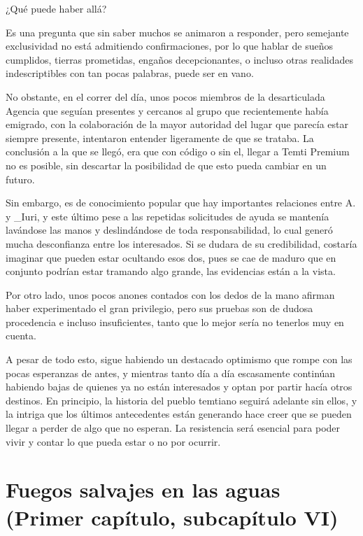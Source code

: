 \documentclass[
  spanish,
]{book}
\begin{document}
¿Qué puede haber allá?

Es una pregunta que sin saber muchos se animaron a responder, pero semejante exclusividad no está admitiendo confirmaciones, por lo que hablar de sueños cumplidos, tierras prometidas, engaños decepcionantes, o incluso otras realidades indescriptibles con tan pocas palabras, puede ser en vano.

No obstante, en el correr del día, unos pocos miembros de la desarticulada Agencia que seguían presentes y cercanos al grupo que recientemente había emigrado, con la colaboración de la mayor autoridad del lugar que parecía estar siempre presente, intentaron entender ligeramente de que se trataba. La conclusión a la que se llegó, era que con código o sin el, llegar a Temti Premium no es posible, sin descartar la posibilidad de que esto pueda cambiar en un futuro.

Sin embargo, es de conocimiento popular que hay importantes relaciones entre A. y \_Iuri, y este último pese a las repetidas solicitudes de ayuda se mantenía lavándose las manos y deslindándose de toda responsabilidad, lo cual generó mucha desconfianza entre los interesados. Si se dudara de su credibilidad, costaría imaginar que pueden estar ocultando esos dos, pues se cae de maduro que en conjunto podrían estar tramando algo grande, las evidencias están a la vista.

Por otro lado, unos pocos anones contados con los dedos de la mano afirman haber experimentado el gran privilegio, pero sus pruebas son de dudosa procedencia e incluso insuficientes, tanto que lo mejor sería no tenerlos muy en cuenta.

A pesar de todo esto, sigue habiendo un destacado optimismo que rompe con las pocas esperanzas de antes, y mientras tanto día a día escasamente continúan habiendo bajas de quienes ya no están interesados y optan por partir hacía otros destinos. En principio, la historia del pueblo temtiano seguirá adelante sin ellos, y la intriga que los últimos antecedentes están generando hace creer que se pueden llegar a perder de algo que no esperan. La resistencia será esencial para poder vivir y contar lo que pueda estar o no por ocurrir.

\hypertarget{fuegos-salvajes-en-las-aguas-primer-capuxedtulo-subcapuxedtulo-vi}{%
\section{Fuegos salvajes en las aguas (Primer capítulo, subcapítulo VI)}\label{fuegos-salvajes-en-las-aguas-primer-capuxedtulo-subcapuxedtulo-vi}}
\end{document}
